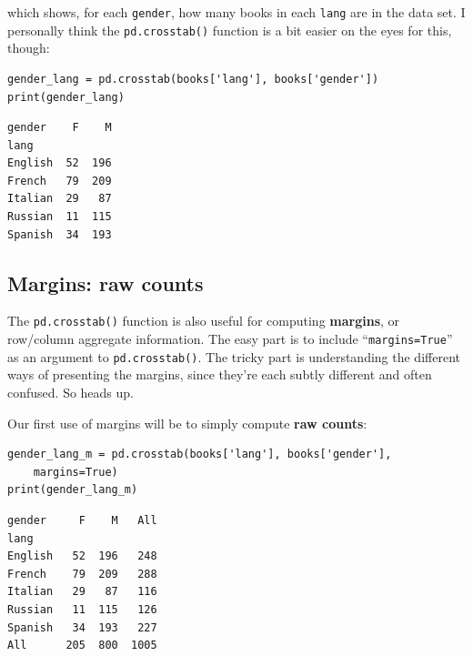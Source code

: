 
which shows, for each \texttt{gender}, how many books in each \texttt{lang} are
in the data set. I personally think the \texttt{pd.crosstab()} function is a
bit easier on the eyes for this, though:


\begin{Verbatim}[fontsize=\footnotesize,samepage=true,frame=single,framesep=3mm]
gender_lang = pd.crosstab(books['lang'], books['gender'])
print(gender_lang)
\end{Verbatim}
\vspace{-.2in}

\begin{Verbatim}[fontsize=\small,samepage=true,frame=leftline,framesep=5mm,framerule=1mm]
gender    F    M
lang
English  52  196
French   79  209
Italian  29   87
Russian  11  115
Spanish  34  193
\end{Verbatim}


\subsection{Margins: raw counts}
\label{marginsBegin}


The \texttt{pd.crosstab()} function is also useful for computing
\textbf{margins}, or row/column aggregate information. The easy part is to
include ``\texttt{margins=True}'' as an argument to \texttt{pd.crosstab()}. The
tricky part is understanding the different ways of presenting the margins,
since they're each subtly different and often confused. So heads up.

\begin{samepage}
Our first use of margins will be to simply compute \textbf{raw counts}:

\begin{Verbatim}[fontsize=\footnotesize,samepage=true,frame=single,framesep=3mm]
gender_lang_m = pd.crosstab(books['lang'], books['gender'],
    margins=True)
print(gender_lang_m)
\end{Verbatim}
\vspace{-.2in}
\end{samepage}

\begin{Verbatim}[fontsize=\small,samepage=true,frame=leftline,framesep=5mm,framerule=1mm]
gender     F    M   All
lang
English   52  196   248
French    79  209   288
Italian   29   87   116
Russian   11  115   126
Spanish   34  193   227
All      205  800  1005
\end{Verbatim}

